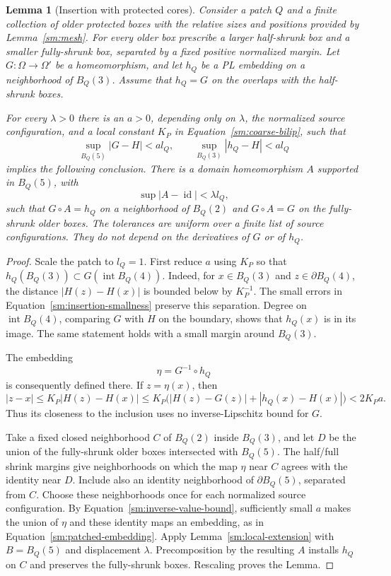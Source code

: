 \documentclass[11pt]{article}
\numberwithin{equation}{section}
\newtheorem{lemma}[theorem]{Lemma}
\theoremstyle{definition}
\theoremstyle{remark}
\begin{document}
\begin{lemma}[Insertion with protected cores]
\label{sm:insertion}
Consider a patch $Q$ and a finite collection of older protected
boxes with the relative sizes and positions provided by
Lemma~\ref{sm:mesh}.  For every older box prescribe a larger
half-shrunk box and a smaller fully-shrunk box, separated by a
fixed positive normalized margin.  Let $G:\Omega\to\Omega'$ be
a homeomorphism, and let $h_Q$ be a PL embedding on a neighborhood
of $B_Q(3)$.  Assume that $h_Q=G$ on the overlaps with the
half-shrunk boxes.

For every $\lambda>0$ there is an $a>0$, depending only on
$\lambda$, the normalized source configuration, and a local
constant $K_P$ in Equation~\eqref{sm:coarse-bilip}, such that
\begin{equation}
 \label{sm:insertion-smallness}
 \sup_{B_Q(5)}|G-H|<a l_Q,
 \qquad \sup_{B_Q(3)}|h_Q-H|<a l_Q
\end{equation}
implies the following conclusion.  There is a domain
homeomorphism $A$ supported in $B_Q(5)$, with
\[
 \sup|A-\operatorname{id}|<\lambda l_Q,
\]
such that $G\circ A=h_Q$ on a neighborhood of $B_Q(2)$ and
$G\circ A=G$ on the fully-shrunk older boxes.  The tolerances
are uniform over a finite list of source configurations.  They
do not depend on the derivatives of $G$ or of $h_Q$.
\end{lemma}

\begin{proof}
Scale the patch to $l_Q=1$.  First reduce $a$ using $K_P$ so
that $h_Q(B_Q(3))\subset G(\operatorname{int}B_Q(4))$.
Indeed, for $x\in B_Q(3)$ and $z\in\partial B_Q(4)$,
the distance $|H(z)-H(x)|$ is bounded below by $K_P^{-1}$.
The small errors in Equation~\eqref{sm:insertion-smallness} preserve
this separation.  Degree on $\operatorname{int}B_Q(4)$,
comparing $G$ with $H$ on the boundary, shows that $h_Q(x)$
is in its image.  The same statement holds with a small
margin around $B_Q(3)$.

The embedding
\[
 \eta=G^{-1}\circ h_Q
\]
is consequently defined there.  If $z=\eta(x)$, then
\begin{equation}
 \label{sm:inverse-value-bound}
 |z-x|\le K_P|H(z)-H(x)|
 \le K_P\bigl(|H(z)-G(z)|+|h_Q(x)-H(x)|\bigr)
 <2K_Pa.
\end{equation}
Thus its closeness to the inclusion uses no inverse-Lipschitz
bound for $G$.

Take a fixed closed neighborhood $C$ of $B_Q(2)$ inside
$B_Q(3)$, and let $D$ be the union of the fully-shrunk older
boxes intersected with $B_Q(5)$.  The half/full shrink margins
give neighborhoods on which the map $\eta$ near $C$ agrees
with the identity near $D$.  Include also an identity
neighborhood of $\partial B_Q(5)$, separated from $C$.
Choose these neighborhoods once for each normalized source
configuration.  By Equation~\eqref{sm:inverse-value-bound}, sufficiently
small $a$ makes the union of $\eta$ and these identity maps
an embedding, as in Equation~\eqref{sm:patched-embedding}.  Apply
Lemma~\ref{sm:local-extension} with $B=B_Q(5)$ and displacement
$\lambda$.  Precomposition by the resulting $A$ installs
$h_Q$ on $C$ and preserves the fully-shrunk boxes.  Rescaling
proves the Lemma.
\end{proof}
\end{document}
